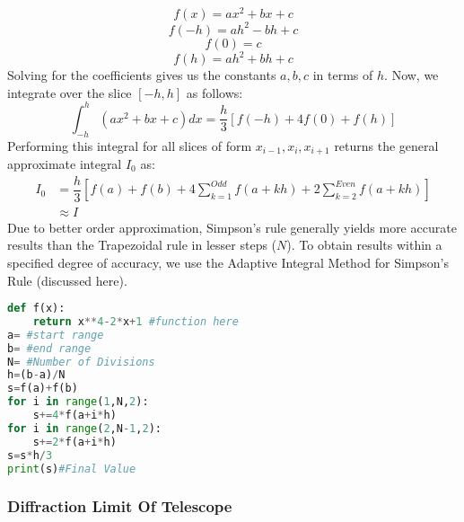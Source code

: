\[	f(x)=ax^{2}+bx+c\]
\[	f(-h)=ah^{2}-bh+c\]
\[	f(0)=c\]
\[	f(h)=ah^{2}+bh+c\]
Solving for the coefficients gives us the constants $a,b,c$ in terms of $h$. Now, we integrate over the slice $[-h,h]$ as follows:
\[\int_{-h}^{h}(ax^{2}+bx+c)dx=\dfrac{h}{3}[f(-h)+4f(0)+f(h)]  \]
Performing this integral for all slices of form $x_{i-1},x_{i},x_{i+1}$ returns the general approximate integral $I_{0}$ as:
\[\begin{split}
I_{0}&=\dfrac{h}{3}[f(a)+f(b)+4\sum_{k=1}^{Odd}f(a+kh)+2\sum_{k=2}^{Even}f(a+kh)]\\
&\approx I
\end{split}\]
Due to better order approximation, Simpson's rule generally yields more accurate results than the Trapezoidal rule in lesser steps ($N$). To obtain results within a specified degree of accuracy, we use the Adaptive Integral Method for Simpson's Rule (discussed here).
\begin{lstlisting}[language=Python, caption=Simpson's Rule, frame=single, label={lst:L4} ]
def f(x):
	return x**4-2*x+1 #function here
a= #start range
b= #end range
N= #Number of Divisions
h=(b-a)/N
s=f(a)+f(b)
for i in range(1,N,2):
	s+=4*f(a+i*h)
for i in range(2,N-1,2):
	s+=2*f(a+i*h)
s=s*h/3 
print(s)#Final Value
\end{lstlisting}
\subsubsection{Diffraction Limit Of Telescope}